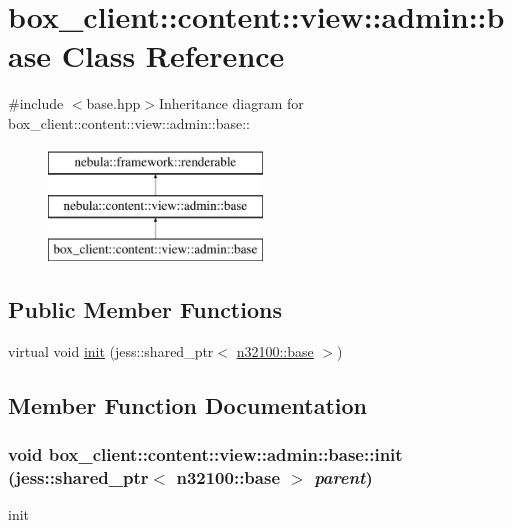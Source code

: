\hypertarget{classbox__client_1_1content_1_1view_1_1admin_1_1base}{
\section{box\_\-client::content::view::admin::base Class Reference}
\label{classbox__client_1_1content_1_1view_1_1admin_1_1base}
}


{\ttfamily \#include $<$base.hpp$>$}Inheritance diagram for box\_\-client::content::view::admin::base::\begin{figure}[H]
\begin{center}
\leavevmode
\includegraphics[height=3cm]{classbox__client_1_1content_1_1view_1_1admin_1_1base}
\end{center}
\end{figure}
\subsection*{Public Member Functions}
\begin{DoxyCompactItemize}
\item 
virtual void \hyperlink{classbox__client_1_1content_1_1view_1_1admin_1_1base_af88601d48e2691df5b15427b3cccb7a9}{init} (jess::shared\_\-ptr$<$ \hyperlink{classnebula_1_1content_1_1scene_1_1admin_1_1base}{n32100::base} $>$)
\end{DoxyCompactItemize}


\subsection{Member Function Documentation}
\hypertarget{classbox__client_1_1content_1_1view_1_1admin_1_1base_af88601d48e2691df5b15427b3cccb7a9}{
\subsubsection[{init}]{\setlength{\rightskip}{0pt plus 5cm}void box\_\-client::content::view::admin::base::init (jess::shared\_\-ptr$<$ {\bf n32100::base} $>$ {\em parent})}}
\label{classbox__client_1_1content_1_1view_1_1admin_1_1base_af88601d48e2691df5b15427b3cccb7a9}
init 

